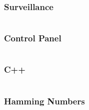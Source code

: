 \documentclass{beamer}
\begin{document}
\begin{frame} \frametitle{Surveillance}
\inputminted[fontsize=\scriptsize]{java}{code/Surveillance.java}
\end{frame}
\begin{frame}[allowframebreaks] \frametitle{Control Panel}
\inputminted[fontsize=\tiny]{java}{code/ControlPanel.java}
\end{frame}
\begin{frame}[allowframebreaks] \frametitle{C++}
\inputminted[fontsize=\tiny]{cpp}{code/StreamMerger.cpp}
\end{frame}
\begin{frame} \frametitle{Hamming Numbers}
\inputminted[fontsize=\tiny]{java}{code/Hamming.java}
\end{frame}
\end{document}
